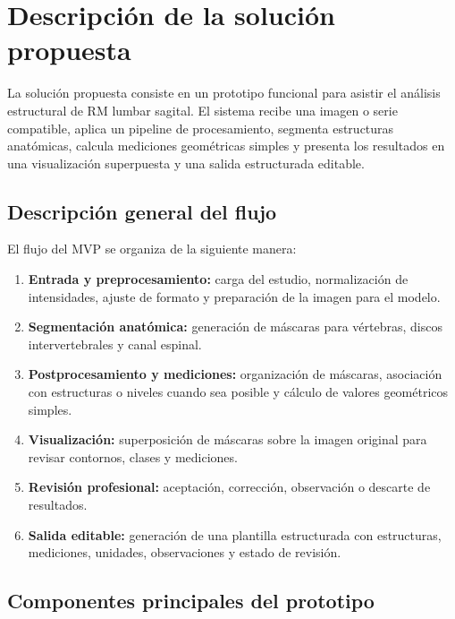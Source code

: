 \chapter{Descripci\'on de la soluci\'on propuesta}

La soluci\'on propuesta consiste en un prototipo funcional para asistir el an\'alisis estructural de RM lumbar sagital. El sistema recibe una imagen o serie compatible, aplica un pipeline de procesamiento, segmenta estructuras anat\'omicas, calcula mediciones geom\'etricas simples y presenta los resultados en una visualizaci\'on superpuesta y una salida estructurada editable.

\section{Descripci\'on general del flujo}

El flujo del MVP se organiza de la siguiente manera:

\begin{enumerate}
    \item \textbf{Entrada y preprocesamiento:} carga del estudio, normalizaci\'on de intensidades, ajuste de formato y preparaci\'on de la imagen para el modelo.
    \item \textbf{Segmentaci\'on anat\'omica:} generaci\'on de m\'ascaras para v\'ertebras, discos intervertebrales y canal espinal.
    \item \textbf{Postprocesamiento y mediciones:} organizaci\'on de m\'ascaras, asociaci\'on con estructuras o niveles cuando sea posible y c\'alculo de valores geom\'etricos simples.
    \item \textbf{Visualizaci\'on:} superposici\'on de m\'ascaras sobre la imagen original para revisar contornos, clases y mediciones.
    \item \textbf{Revisi\'on profesional:} aceptaci\'on, correcci\'on, observaci\'on o descarte de resultados.
    \item \textbf{Salida editable:} generaci\'on de una plantilla estructurada con estructuras, mediciones, unidades, observaciones y estado de revisi\'on.
\end{enumerate}

\section{Componentes principales del prototipo}

